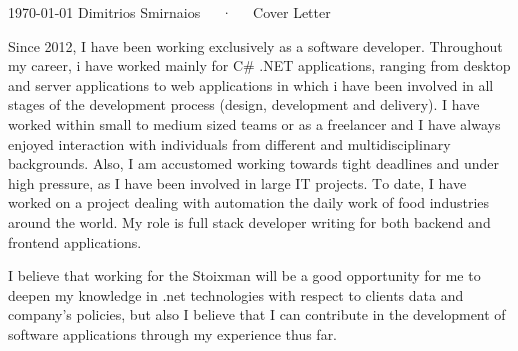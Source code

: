\documentclass[11pt, a4paper]{awesome-cv}
\begin{document}
\makecvheader[R]

\makecvfooter
  {\today}
  {Dimitrios Smirnaios~~~·~~~Cover Letter}
  {}

\makelettertitle

\begin{cvletter}

Since 2012, I have been working exclusively as a software developer. Throughout my career, i have worked mainly for C\# .NET applications, ranging from desktop and server applications to web applications in which i have been involved in all stages of the development process (design, development and delivery). I have worked within small to medium sized teams or as a freelancer and I have always enjoyed interaction with individuals from different and multidisciplinary backgrounds. Also, I am accustomed working towards tight deadlines and under high pressure, as I have been involved in large IT projects. Τo date, I have worked on a project dealing with automation the daily work of food industries around the world. My role is full stack developer writing for both backend and frontend applications.

I believe that working for the Stoixman will be a good opportunity for me to deepen my knowledge in .net technologies with respect to clients data and company's policies, but also I believe that I can contribute in the development of software applications through my experience thus far.


\end{cvletter}
\end{document}

